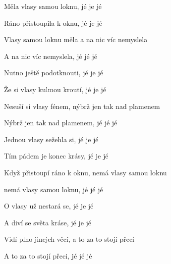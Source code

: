 \begin{song}


\large


\Large

\bigskip

Měla vlasy samou loknu, jé je jé \par
{}Ráno přistoupila k oknu, jé je jé \par
{}Vlasy samou loknu měla a na nic víc nemyslela \par
{}A na nic víc nemyslela, jé jé jé \par

\bigskip


\bigskip

Nutno ještě podotknouti, jé je jé \par
{}Že si vlasy kulmou kroutí, jé je jé \par
{}Nesuší si vlasy fénem, nýbrž jen tak nad plamenem \par
{}Nýbrž jen tak nad plamenem, jé jé jé \par

\bigskip


\bigskip

Jednou vlasy sežehla si, jé je jé \par
{}Tím pádem je konec krásy, jé je jé \par
{}Když přistoupí ráno k oknu, nemá vlasy samou loknu \par
{}nemá vlasy samou loknu, jé jé jé \par

\bigskip


\bigskip

O vlasy už nestará se, jé je jé \par
{}A diví se světa kráse, jé je jé \par
{}Vidí plno jinejch věcí, a to za to stojí přeci \par
{}A to za to stojí přeci, jé jé jé \par


\end{song}
